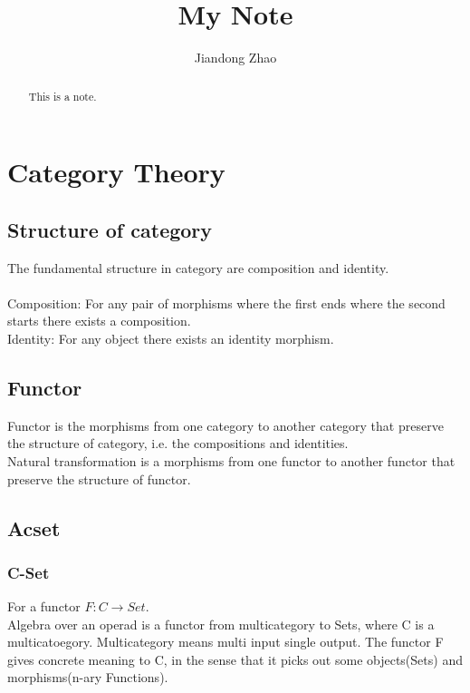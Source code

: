 \documentclass{article}
\title{My Note}
\author{Jiandong Zhao}
\begin{document}
\maketitle

\begin{abstract}
This is a note.
\end{abstract}

\section{Category Theory}

\subsection{Structure of category}

The fundamental structure in category are composition and identity.
\\
\\
Composition: For any pair of morphisms where the first ends where the second starts there exists a composition.
\\
Identity: For any object there exists an identity morphism.

\subsection{Functor}

Functor is the morphisms from one category to another category that preserve the structure of category, i.e. the compositions and identities.
\\
Natural transformation is a morphisms from one functor to another functor that preserve the structure of functor.

\subsection{Acset}
\subsubsection{C-Set}
For a functor $F: C \rightarrow Set$.
\\
Algebra over an operad is a functor from multicategory to Sets, where C is a multicatoegory. Multicategory means multi input single output. The functor F gives concrete meaning to C, in the sense that it picks out some objects(Sets) and morphisms(n-ary Functions).
\end{document}
